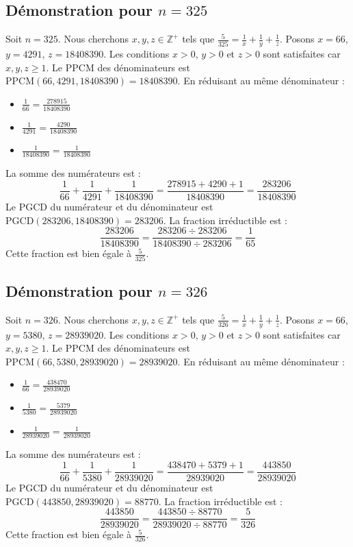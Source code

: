 \documentclass[11pt,a4paper]{article}
\begin{document}
\subsection{Démonstration pour $n = 325$}
Soit $n = 325$. Nous cherchons $x, y, z \in \mathbb{Z}^{+}$ tels que $\frac{5}{325} = \frac{1}{x} + \frac{1}{y} + \frac{1}{z}$.
Posons $x = 66$, $y = 4291$, $z = 18408390$.
Les conditions $x > 0$, $y > 0$ et $z > 0$ sont satisfaites car $x, y, z \geq 1$.
Le PPCM des dénominateurs est $\text{PPCM}(66, 4291, 18408390) = 18408390$.
En réduisant au même dénominateur :
\begin{itemize}
    \item $\frac{1}{66} = \frac{278915}{18408390}$
    \item $\frac{1}{4291} = \frac{4290}{18408390}$
    \item $\frac{1}{18408390} = \frac{1}{18408390}$
\end{itemize}
La somme des numérateurs est :
$$ \frac{1}{66} + \frac{1}{4291} + \frac{1}{18408390} = \frac{278915 + 4290 + 1}{18408390} = \frac{283206}{18408390} $$
Le PGCD du numérateur et du dénominateur est $\text{PGCD}(283206, 18408390) = 283206$.
La fraction irréductible est :
$$ \frac{283206}{18408390} = \frac{283206 \div 283206}{18408390 \div 283206} = \frac{1}{65} $$
Cette fraction est bien égale à $\frac{5}{325}$.

\subsection{Démonstration pour $n = 326$}
Soit $n = 326$. Nous cherchons $x, y, z \in \mathbb{Z}^{+}$ tels que $\frac{5}{326} = \frac{1}{x} + \frac{1}{y} + \frac{1}{z}$.
Posons $x = 66$, $y = 5380$, $z = 28939020$.
Les conditions $x > 0$, $y > 0$ et $z > 0$ sont satisfaites car $x, y, z \geq 1$.
Le PPCM des dénominateurs est $\text{PPCM}(66, 5380, 28939020) = 28939020$.
En réduisant au même dénominateur :
\begin{itemize}
    \item $\frac{1}{66} = \frac{438470}{28939020}$
    \item $\frac{1}{5380} = \frac{5379}{28939020}$
    \item $\frac{1}{28939020} = \frac{1}{28939020}$
\end{itemize}
La somme des numérateurs est :
$$ \frac{1}{66} + \frac{1}{5380} + \frac{1}{28939020} = \frac{438470 + 5379 + 1}{28939020} = \frac{443850}{28939020} $$
Le PGCD du numérateur et du dénominateur est $\text{PGCD}(443850, 28939020) = 88770$.
La fraction irréductible est :
$$ \frac{443850}{28939020} = \frac{443850 \div 88770}{28939020 \div 88770} = \frac{5}{326} $$
Cette fraction est bien égale à $\frac{5}{326}$.
\end{document}
